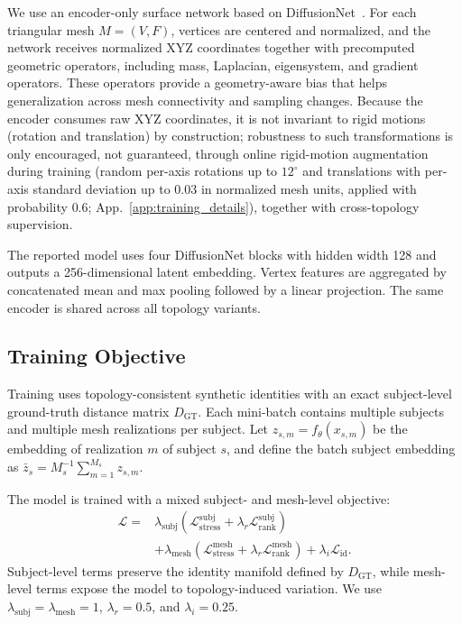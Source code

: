 \documentclass[10pt,twocolumn,letterpaper]{article}
\begin{document}
We use an encoder-only surface network based on DiffusionNet~\cite{diffusionet}. 
For each triangular mesh $M=(V,F)$, vertices are centered and normalized, and the network receives normalized XYZ coordinates together with precomputed geometric operators, including mass, Laplacian, eigensystem, and gradient operators. These operators provide a geometry-aware bias that helps generalization across mesh connectivity and sampling changes. Because the encoder consumes raw XYZ coordinates, it is not invariant to rigid motions (rotation and translation) by construction; robustness to such transformations is only encouraged, not guaranteed, through online rigid-motion augmentation during training (random per-axis rotations up to $12^\circ$ and translations with per-axis standard deviation up to $0.03$ in normalized mesh units, applied with probability $0.6$; App.~\ref{app:training_details}), together with cross-topology supervision.

The reported model uses four DiffusionNet blocks with hidden width 128 and outputs a 256-dimensional latent embedding. Vertex features are aggregated by concatenated mean and max pooling followed by a linear projection. The same encoder is shared across all topology variants.
\subsection{Training Objective}
\label{sec:training_objective}

Training uses topology-consistent synthetic identities with an exact subject-level
ground-truth distance matrix $D_{\mathrm{GT}}$. Each mini-batch contains multiple
subjects and multiple mesh realizations per subject. Let
$z_{s,m}=f_\theta(x_{s,m})$ be the embedding of realization $m$ of subject $s$,
and define the batch subject embedding as
$\bar z_s = M_s^{-1}\sum_{m=1}^{M_s} z_{s,m}$.

The model is trained with a mixed subject- and mesh-level objective:
\begin{equation}
\begin{split}
\mathcal L ={}&
\lambda_{\mathrm{subj}}
\left(
\mathcal L^{\mathrm{subj}}_{\mathrm{stress}}
+
\lambda_r \mathcal L^{\mathrm{subj}}_{\mathrm{rank}}
\right)
\\
&+
\lambda_{\mathrm{mesh}}
\left(
\mathcal L^{\mathrm{mesh}}_{\mathrm{stress}}
+
\lambda_r \mathcal L^{\mathrm{mesh}}_{\mathrm{rank}}
\right)
+
\lambda_i \mathcal L_{\mathrm{id}} .
\end{split}
\end{equation}
Subject-level terms preserve the identity manifold defined by $D_{\mathrm{GT}}$,
while mesh-level terms expose the model to topology-induced variation. We use
$\lambda_{\mathrm{subj}}=\lambda_{\mathrm{mesh}}=1$, $\lambda_r=0.5$, and
$\lambda_i=0.25$.
\end{document}
